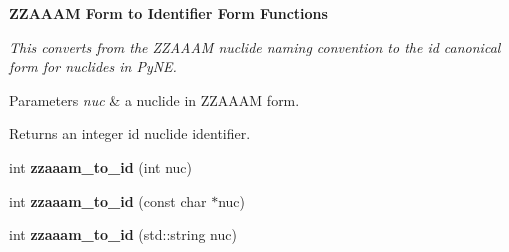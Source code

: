 \begin{Indent}{\bf Z\+Z\+A\+A\+AM Form to Identifier Form Functions}\par
{\em This converts from the Z\+Z\+A\+A\+AM nuclide naming convention to the id canonical form for nuclides in Py\+NE. 
\begin{DoxyParams}{Parameters}
{\em nuc} & a nuclide in Z\+Z\+A\+A\+AM form. \\
\hline
\end{DoxyParams}
\begin{DoxyReturn}{Returns}
an integer id nuclide identifier. 
\end{DoxyReturn}
}\begin{DoxyCompactItemize}
\item 
int {\bfseries zzaaam\+\_\+to\+\_\+id} (int nuc)\hypertarget{namespacepyne_1_1nucname_a91692dd60121331c14b1dbf0a37019d5}{}\label{namespacepyne_1_1nucname_a91692dd60121331c14b1dbf0a37019d5}

\item 
int {\bfseries zzaaam\+\_\+to\+\_\+id} (const char $\ast$nuc)\hypertarget{namespacepyne_1_1nucname_a411c312b33b1af652a081491ed67fe7b}{}\label{namespacepyne_1_1nucname_a411c312b33b1af652a081491ed67fe7b}

\item 
int {\bfseries zzaaam\+\_\+to\+\_\+id} (std\+::string nuc)\hypertarget{namespacepyne_1_1nucname_ac99a1d1c1e89b821823e3f2cc8bd8070}{}\label{namespacepyne_1_1nucname_ac99a1d1c1e89b821823e3f2cc8bd8070}

\end{DoxyCompactItemize}
\end{Indent}
